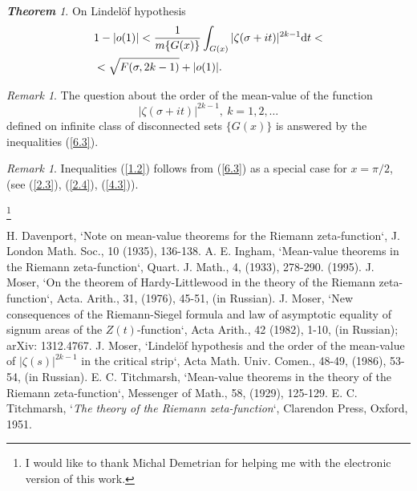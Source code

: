 \documentclass{amsart}
\theoremstyle{definition}
\theoremstyle{remark}
\newtheorem{remark}[]{Remark}
\newtheorem*{mydef1}{{\bf Theorem}}
\numberwithin{equation}{section}
\begin{document}
\begin{mydef1}
On Lindel\" of hypothesis
\begin{equation} \label{6.3}
\begin{split}
& 1-|o(1)|<\frac{1}{m\{ G(x)\}}\int_{G(x)}|\zeta(\sigma+it)|^{2k-1}{\rm d}t< \\
& < \sqrt{F(\sigma,2k-1)}+|o(1)|.
\end{split}
\end{equation}
\end{mydef1}

\begin{remark}
The question about the order of the mean-value of the function
\begin{displaymath}
|\zeta(\sigma+it)|^{2k-1},\ k=1,2,\dots
\end{displaymath}
defined on infinite class of disconnected sets $\{ G(x)\}$ is answered by the inequalities (\ref{6.3}).
\end{remark}

\begin{remark}
Inequalities (\ref{1.2}) follows from (\ref{6.3}) as a special case for $x=\pi/2$, (see (\ref{2.3}), (\ref{2.4}), (\ref{4.3})).
\end{remark}

\thanks{I would like to thank Michal Demetrian for helping me with the electronic version of this work.}

\begin{thebibliography}{29}
H. Davenport, `Note on mean-value theorems for the Riemann zeta-function`, J. London Math. Soc., 10 (1935), 136-138.
A. E. Ingham, `Mean-value theorems in the Riemann zeta-function`, Quart. J. Math., 4, (1933), 278-290.
(1995).
J. Moser, `On the theorem of Hardy-Littlewood in the theory of the Riemann zeta-function`,
Acta. Arith., 31, (1976), 45-51, (in Russian).
J. Moser, `New consequences of the Riemann-Siegel formula and law of asymptotic equality of signum areas of the $Z(t)$-function`,
Acta Arith., 42 (1982), 1-10, (in Russian); arXiv: 1312.4767.
J. Moser, `Lindel\" of hypothesis and the order of the mean-value of $|\zeta(s)|^{2k-1}$ in the critical strip`, Acta Math. Univ. Comen., 48-49, (1986), 53-54, (in Russian).
E. C. Titchmarsh, `Mean-value theorems in the theory of the Riemann zeta-function`, Messenger of Math., 58, (1929), 125-129.
E. C. Titchmarsh, `\emph{The theory of the Riemann zeta-function}`, Clarendon Press, Oxford, 1951.
\end{thebibliography}
\end{document}
